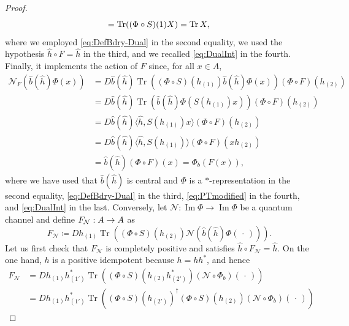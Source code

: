 \documentclass[a4paper,10pt]{amsart}
\newcommand{\Noisy}{\mathcal{N}}
\newcommand{\eval}[2]{\langle #1 , #2\rangle}
\newcommand{\placeholder}{\,\cdot\,}
\theoremstyle{definition}
\begin{document}
\begin{proof}
\begin{align}
        =
        \operatorname{Tr}((\Phi\circ S)(1)X)
        =
        \operatorname{Tr}X,
        \vphantom{\hat{h}} %
	\end{align}
	where we employed \cref{eq:DefBdry-Dual} in the second equality, we used the hypothesis $\hat{h}\circ F = \hat{h}$ in the third, and we recalled \cref{eq:DualInt} in the fourth.
    Finally, it implements the action of $F$ since, for all $x\in A$,
	\begin{align}
		\Noisy_F(\hat{b}(\hat{h})\Phi(x))
		  & =
        D \hat{b}(\hat{h})
        \operatorname{Tr}((\Phi\circ S)(h_{(1)})
        \hat{b}(\hat{h})\Phi(x))
        (\Phi\circ F)(h_{(2)})
		\\ &
        =
        D \hat{b}(\hat{h})
        \operatorname{Tr}(\hat{b}(\hat{h})\Phi(S(h_{(1)})x))
        (\Phi\circ F)(h_{(2)})
		\\ &
        =
        D \hat{b}(\hat{h}) 
        \eval{\hat{h}}{S(h_{(1)}) x} 
        (\Phi\circ F)(h_{(2)})
		\\ &
        =
        D \hat{b}(\hat{h})
        \eval{\hat{h}}{S(h_{(1)})}
        (\Phi\circ F)(x h_{(2)})
		\\ &
        =
        \hat{b}(\hat{h}) (\Phi\circ F)(x)
        =
        \Phi_b(F(x)),
	\end{align}
	where we have used that $\hat{b}(\hat{h})$ is central and $\Phi$ is a $*$-re\-pre\-sen\-ta\-tion in the second equality, \cref{eq:DefBdry-Dual} in the third, \cref{eq:PTmodified} in the fourth, and \cref{eq:DualInt} in the last.
	\smallbreak\noindent%
	Conversely, let $\Noisy:\operatorname{Im}\Phi\to\operatorname{Im}\Phi$ be a quantum channel and define $F_{\smash{\Noisy}}:A\to A$ as
	\begin{equation}\label{eq:defFfromN}
		F_{\Noisy}
        \coloneqq
        D h_{(1)} \operatorname{Tr}(
            (\Phi\circ S)(h_{(2)})
            \Noisy(\hat{b}(\hat{h})\Phi(\placeholder))
        ).
	\end{equation}
	Let us first check that $F_{\Noisy}$ is completely positive and satisfies $\hat{h}\circ F_{\Noisy} = \hat{h}$.
	On the one hand, $h$ is a positive idempotent because $h = hh^*$, and hence
	\begin{align}
		F_{\Noisy}
        & =
        D h_{(1)} h_{(1')}^*
        \operatorname{Tr}((\Phi\circ S)(h_{(2)}h_{(2')}^*) (\Noisy\circ \Phi_b)(\placeholder))
		\\ &
        =
        D h_{(1)} h_{(1')}^*
        \operatorname{Tr}((\Phi\circ S)(h_{(2')})^\dagger(\Phi\circ S)(h_{(2)}) (\Noisy\circ \Phi_b)(\placeholder))

\end{align}
\end{proof}
\end{document}
